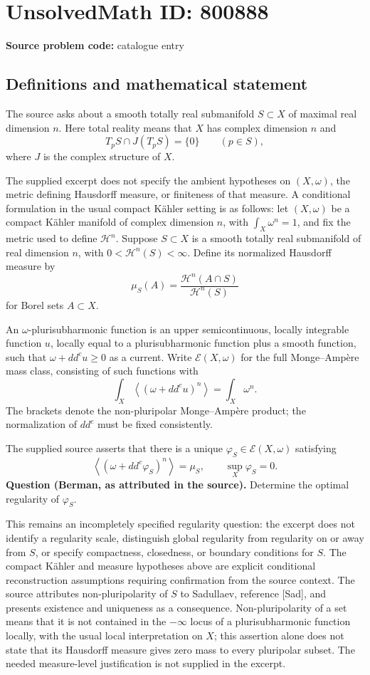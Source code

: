\documentclass[11pt]{article}
\begin{document}
\section*{UnsolvedMath ID: 800888}
\textbf{Source problem code:} catalogue entry
\subsection{Definitions and mathematical statement}
The source asks about a smooth totally real submanifold \(S\subset X\) of maximal real dimension \(n\). Here total reality means that \(X\) has complex dimension \(n\) and
\[
T_pS\cap J(T_pS)=\{0\}\qquad(p\in S),
\]
where \(J\) is the complex structure of \(X\).

The supplied excerpt does not specify the ambient hypotheses on \((X,\omega)\), the metric defining Hausdorff measure, or finiteness of that measure. A conditional formulation in the usual compact K\"ahler setting is as follows: let \((X,\omega)\) be a compact K\"ahler manifold of complex dimension \(n\), with \(\int_X\omega^n=1\), and fix the metric used to define \(\mathcal H^n\). Suppose \(S\subset X\) is a smooth totally real submanifold of real dimension \(n\), with \(0<\mathcal H^n(S)<\infty\). Define its normalized Hausdorff measure by
\[
\mu_S(A)=\frac{\mathcal H^n(A\cap S)}{\mathcal H^n(S)}
\]
for Borel sets \(A\subset X\).

An \(\omega\)-plurisubharmonic function is an upper semicontinuous, locally integrable function \(u\), locally equal to a plurisubharmonic function plus a smooth function, such that \(\omega+dd^cu\geq0\) as a current. Write \(\mathcal E(X,\omega)\) for the full Monge--Amp\`ere mass class, consisting of such functions with
\[
\int_X\left\langle(\omega+dd^cu)^n\right\rangle=\int_X\omega^n.
\]
The brackets denote the non-pluripolar Monge--Amp\`ere product; the normalization of \(dd^c\) must be fixed consistently.

The supplied source asserts that there is a unique \(\varphi_S\in\mathcal E(X,\omega)\) satisfying
\[
\left\langle(\omega+dd^c\varphi_S)^n\right\rangle=\mu_S,
\qquad \sup_X\varphi_S=0.
\]
\textbf{Question (Berman, as attributed in the source).} Determine the optimal regularity of \(\varphi_S\).

This remains an incompletely specified regularity question: the excerpt does not identify a regularity scale, distinguish global regularity from regularity on or away from \(S\), or specify compactness, closedness, or boundary conditions for \(S\). The compact K\"ahler and measure hypotheses above are explicit conditional reconstruction assumptions requiring confirmation from the source context. The source attributes non-pluripolarity of \(S\) to Sadullaev, reference [Sad], and presents existence and uniqueness as a consequence. Non-pluripolarity of a set means that it is not contained in the \(-\infty\) locus of a plurisubharmonic function locally, with the usual local interpretation on \(X\); this assertion alone does not state that its Hausdorff measure gives zero mass to every pluripolar subset. The needed measure-level justification is not supplied in the excerpt.
\end{document}
